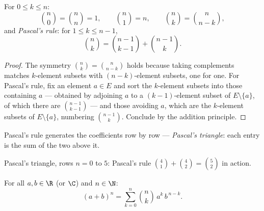 \begin{proposition}\label{prop:tle:comb:identities}
For $0 \leq k \leq n$:
\[
\binom{n}{0} = \binom{n}{n} = 1, \qquad
\binom{n}{1} = n, \qquad
\binom{n}{k} = \binom{n}{n-k},
\]
and \emph{Pascal's rule}: for $1 \leq k \leq n-1$,
\[
\binom{n}{k} = \binom{n-1}{k-1} + \binom{n-1}{k}.
\]
\end{proposition}

\begin{proof}
The symmetry $\binom nk = \binom{n}{n-k}$ holds because taking complements
matches $k$-element subsets with $(n-k)$-element subsets, one for one. For
Pascal's rule, fix an element $a \in E$ and sort the $k$-element subsets into
those containing $a$ --- obtained by adjoining $a$ to a $(k-1)$-element
subset of $E \setminus \{a\}$, of which there are $\binom{n-1}{k-1}$ --- and
those avoiding $a$, which are the $k$-element subsets of
$E \setminus \{a\}$, numbering $\binom{n-1}{k}$. Conclude by the addition
principle.
\end{proof}

Pascal's rule generates the coefficients row by row --- \emph{Pascal's
triangle}: each entry is the sum of the two above it.

\begin{omfigure}

{\small Pascal's triangle, rows $n = 0$ to $5$: Pascal's rule
$\binom{4}{1} + \binom{4}{2} = \binom{5}{2}$ in action.}
\end{omfigure}

\begin{theorem}\label{thm:tle:comb:binomial}
For all $a, b \in \R$ (or $\C$) and $n \in \N$:
\[
(a+b)^n = \sum_{k=0}^{n} \binom{n}{k}\, a^{k}\, b^{\,n-k} .
\]
\end{theorem}

